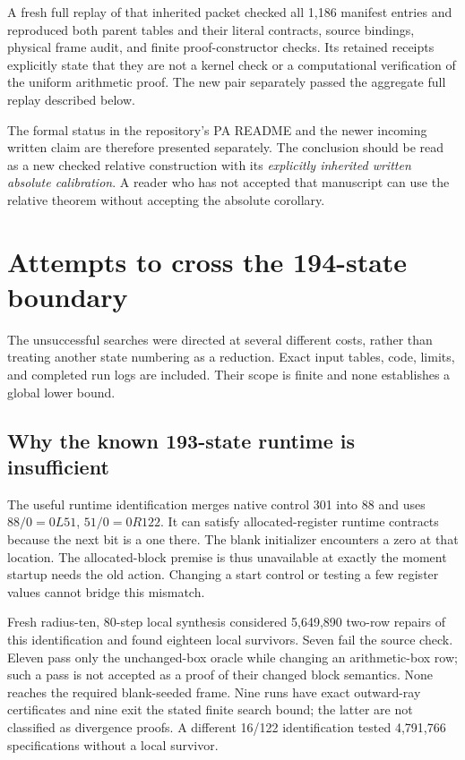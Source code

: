 \documentclass[10pt,letterpaper]{article}
\begin{document}
A fresh full replay of that inherited packet checked all 1,186 manifest
entries and reproduced both parent tables and their literal contracts,
source bindings, physical frame audit, and finite proof-constructor
checks. Its retained receipts explicitly state that they are not a kernel
check or a computational verification of the uniform arithmetic proof.
The new pair separately passed the aggregate full replay described below.

The formal status in the repository's PA README and the newer incoming
written claim are therefore presented separately. The conclusion should
be read as a new checked relative construction with its \emph{explicitly
inherited written absolute calibration}. A reader who has not accepted
that manuscript can use the relative theorem without accepting the
absolute corollary.

\section{Attempts to cross the 194-state boundary}
\label{sec:search}

The unsuccessful searches were directed at several different costs,
rather than treating another state numbering as a reduction. Exact input
tables, code, limits, and completed run logs are included. Their scope is
finite and none establishes a global lower bound.



\subsection{Why the known 193-state runtime is insufficient}

The useful runtime identification merges native control 301 into 88 and
uses $88/0=0L51$, $51/0=0R122$. It can satisfy allocated-register runtime
contracts because the next bit is a one there. The blank initializer
encounters a zero at that location. The allocated-block premise is thus
unavailable at exactly the moment startup needs the old action.
Changing a start control or testing a few register values cannot bridge
this mismatch.

Fresh radius-ten, 80-step local synthesis considered 5,649,890 two-row
repairs of this identification and found eighteen local survivors.
Seven fail the source check. Eleven pass only the unchanged-box oracle
while changing an arithmetic-box row; such a pass is not accepted as
a proof of their changed block semantics. None reaches the required
blank-seeded frame. Nine runs have exact outward-ray certificates and
nine exit the stated finite search bound; the latter are not classified
as divergence proofs. A different 16/122 identification tested
4,791,766 specifications without a local survivor.
\end{document}
